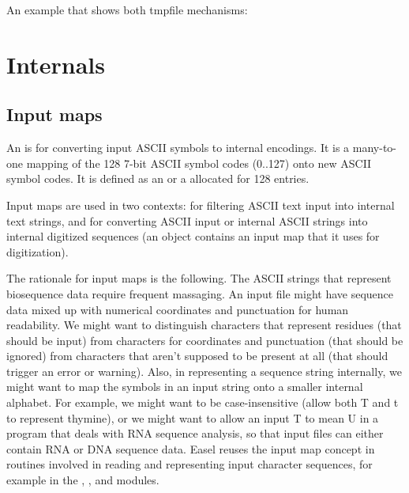 An example that shows both tmpfile mechanisms:



\section{Internals}

\subsection{Input maps}

An  is for converting input ASCII symbols to
internal encodings. It is a many-to-one mapping of the 128 7-bit ASCII
symbol codes (0..127) onto new ASCII symbol codes. It is defined as
an  or a 
allocated for 128 entries.

Input maps are used in two contexts: for filtering ASCII text input
into internal text strings, and for converting ASCII input or internal
ASCII strings into internal digitized sequences (an 
object contains an input map that it uses for digitization).

The rationale for input maps is the following. The ASCII strings that
represent biosequence data require frequent massaging. An input file
might have sequence data mixed up with numerical coordinates and
punctuation for human readability. We might want to distinguish
characters that represent residues (that should be input) from
characters for coordinates and punctuation (that should be ignored)
from characters that aren't supposed to be present at all (that should
trigger an error or warning). Also, in representing a sequence string
internally, we might want to map the symbols in an input string onto a
smaller internal alphabet. For example, we might want to be
case-insensitive (allow both T and t to represent thymine), or we
might want to allow an input T to mean U in a program that deals with
RNA sequence analysis, so that input files can either contain RNA or
DNA sequence data.  Easel reuses the input map concept in routines
involved in reading and representing input character sequences, for
example in the , , and 
modules.

